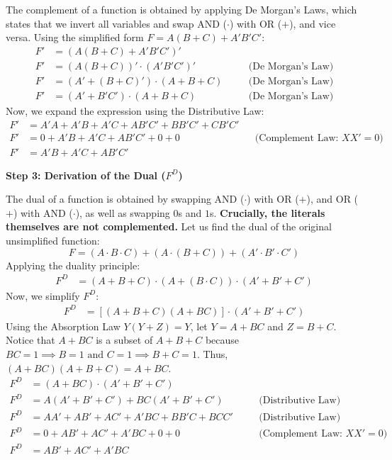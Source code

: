 \documentclass[12pt,a3paper]{article}
\begin{document}
\begin{enumerate}
\begin{tcolorbox}[enhanced,breakable,ansbox,colback=cA!4,colframe=cA,boxrule=0.8pt,arc=5pt,title={\textbf{Answer}},fonttitle=\bfseries\color{white},colbacktitle=cA]
The complement of a function is obtained by applying De Morgan's Laws, which states that we invert all variables and swap AND ($\cdot$) with OR ($+$), and vice versa. Using the simplified form $F = A(B+C) + A'B'C'$:
\begin{align*}
F' &= \left( A(B+C) + A'B'C' \right)' \\
F' &= \left( A(B+C) \right)' \cdot \left( A'B'C' \right)' \quad &&\text{(De Morgan's Law)} \\
F' &= \left( A' + (B+C)' \right) \cdot (A + B + C) \quad &&\text{(De Morgan's Law)} \\
F' &= \left( A' + B'C' \right) \cdot (A + B + C) \quad &&\text{(De Morgan's Law)}
\end{align*}
Now, we expand the expression using the Distributive Law:
\begin{align*}
F' &= A'A + A'B + A'C + AB'C' + BB'C' + CB'C' \\
F' &= 0 + A'B + A'C + AB'C' + 0 + 0 \quad &&\text{(Complement Law: } XX' = 0 \text{)} \\
F' &= A'B + A'C + AB'C'
\end{align*}

\vspace{0.5cm}
\textbf{Step 3: Derivation of the Dual ($F^D$)}

The dual of a function is obtained by swapping AND ($\cdot$) with OR ($+$), and OR ($+$) with AND ($\cdot$), as well as swapping $0$s and $1$s. \textbf{Crucially, the literals themselves are not complemented.} Let us find the dual of the original unsimplified function:
\[ F = (A \cdot B \cdot C) + (A \cdot (B+C)) + (A' \cdot B' \cdot C') \]
Applying the duality principle:
\begin{align*}
F^D &= (A + B + C) \cdot (A + (B \cdot C)) \cdot (A' + B' + C')
\end{align*}
Now, we simplify $F^D$:
\begin{align*}
F^D &= [ (A+B+C)(A+BC) ] \cdot (A' + B' + C')
\end{align*}
Using the Absorption Law $Y(Y+Z) = Y$, let $Y = A+BC$ and $Z = B+C$. Notice that $A+BC$ is a subset of $A+B+C$ because $BC=1 \implies B=1 \text{ and } C=1 \implies B+C=1$. Thus, $(A+BC)(A+B+C) = A+BC$.
\begin{align*}
F^D &= (A + BC) \cdot (A' + B' + C') \\
F^D &= A(A' + B' + C') + BC(A' + B' + C') \quad &&\text{(Distributive Law)} \\
F^D &= AA' + AB' + AC' + A'BC + BB'C + BCC' \quad &&\text{(Distributive Law)} \\
F^D &= 0 + AB' + AC' + A'BC + 0 + 0 \quad &&\text{(Complement Law: } XX'=0 \text{)} \\
F^D &= AB' + AC' + A'BC
\end{align*}


\end{tcolorbox}
\end{enumerate}
\end{document}
